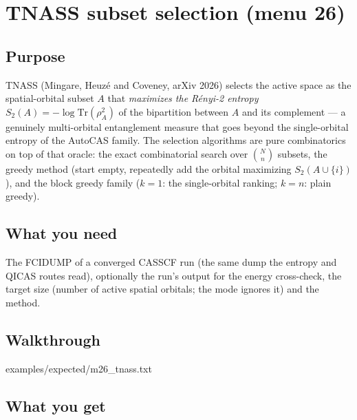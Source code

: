 \chapter{TNASS subset selection (menu 26)}
\label{ch:menu26}

\section{Purpose}

TNASS (Mingare, Heuzé and Coveney, arXiv 2026) selects the active space as
the spatial-orbital subset $A$ that \emph{maximizes the Rényi-2 entropy}
$S_2(A) = -\log \mathrm{Tr}(\rho_A^2)$ of the bipartition between $A$ and its
complement --- a genuinely multi-orbital entanglement measure that goes beyond
the single-orbital entropy of the AutoCAS family.  The selection algorithms
are pure combinatorics on top of that oracle: the exact combinatorial search
over $\binom{N}{n}$ subsets, the greedy method (start empty, repeatedly add
the orbital maximizing $S_2(A \cup \{i\})$), and the block greedy family
($k = 1$: the single-orbital ranking; $k = n$: plain greedy).

\section{What you need}

The FCIDUMP of a converged CASSCF run (the same dump the entropy and QICAS
routes read), optionally the run's output for the energy cross-check, the
target size (number of active spatial orbitals; the  mode ignores
it) and the method.

\section{Walkthrough}


  {examples/expected/m26_tnass.txt}

\section{What you get}

